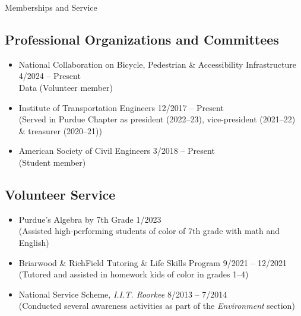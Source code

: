 \documentclass{CV} %
\begin{document}
\begin{rSection}{Memberships and Service}
    \subsection*{Professional Organizations and Committees}
    \begin{itemize}
        \item National Collaboration on Bicycle, Pedestrian \& Accessibility Infrastructure \hfill 4/2024 – Present \\
        Data (Volunteer member)
        \item Institute of Transportation Engineers \hfill 12/2017 – Present \\
        (Served in Purdue Chapter as president (2022–23), vice-president (2021–22) \& treasurer (2020–21))
        \item American Society of Civil Engineers \hfill 3/2018 – Present
        \\ (Student member)
    \end{itemize}
    \subsection*{Volunteer Service}
    \begin{itemize}
        \item Purdue's Algebra by 7th Grade \hfill 1/2023
        \\ (Assisted high-performing students of color of 7th grade with math and English)
        \item Briarwood \& RichField Tutoring \& Life Skills Program \hfill 9/2021 – 12/2021
        \\ (Tutored and assisted in homework kids of color in grades 1–4)
        \item National Service Scheme, \textit{I.I.T. Roorkee} \hfill 8/2013 – 7/2014
        \\ (Conducted several awareness activities as part of the \textit{Environment} section)
    \end{itemize}

\end{rSection}
\end{document}
